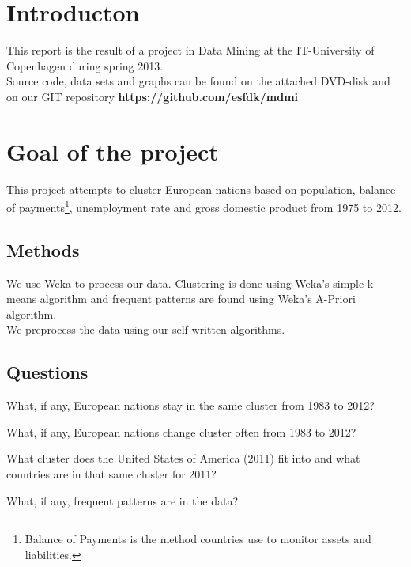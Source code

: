 \section{Introducton}
\label{Intro}
This report is the result of a project in Data Mining at the IT-University of Copenhagen during spring 2013.
\\Source code, data sets and graphs can be found on the attached DVD-disk and on our GIT repository \textbf{https://github.com/esfdk/mdmi}

\section{Goal of the project}
This project attempts to cluster European nations based on population, balance of payments\footnote{Balance of Payments is the method countries use to monitor assets and liabilities.\cite[What Is Balance Of Payments?]{Investopedia}}, unemployment rate and gross domestic product from 1975 to 2012.

\subsection{Methods}
We use Weka to process our data. Clustering is done using Weka's simple k-means algorithm and frequent patterns are found using Weka's A-Priori algorithm.
\\We preprocess the data using our self-written algorithms.

\subsection{Questions}
\label{Intro_que}
\begin{my_itemize}
\item What, if any, European nations stay in the same cluster from 1983 to 2012?
\item What, if any, European nations change cluster often from 1983 to 2012?
\item What cluster does the United States of America (2011) fit into and what countries are in that same cluster for 2011?
\item What, if any, frequent patterns are in the data?
\end{my_itemize}
